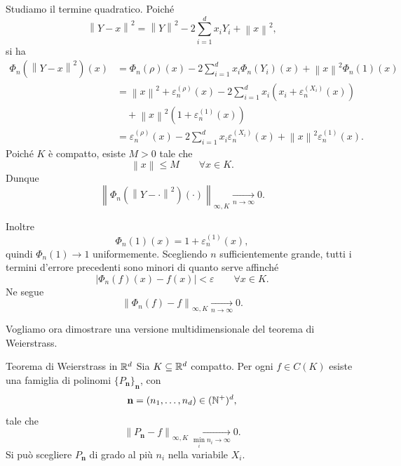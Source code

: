 \documentclass[a4paper]{article}
\begin{document}
\begin{snippetproof}{}
    Studiamo il termine quadratico. Poiché
    \[
        \left\|Y-x\right\|^2
        =
        \left\|Y\right\|^2
        -
        2\sum_{i=1}^{d}x_iY_i
        +
        \left\|x\right\|^2,
    \]
    si ha
    \begin{align*}
        \Phi_n(\left\|Y-x\right\|^2)(x)
        &=
        \Phi_n(\rho)(x)
        -
        2\sum_{i=1}^{d}x_i\Phi_n(Y_i)(x)
        +
        \left\|x\right\|^2\Phi_n(1)(x) \\
        &=
        \left\|x\right\|^2+\varepsilon_n^{(\rho)}(x)
        -
        2\sum_{i=1}^{d}x_i
        \left(x_i+\varepsilon_n^{(X_i)}(x)\right) \\
        &\quad
        +
        \left\|x\right\|^2
        \left(1+\varepsilon_n^{(1)}(x)\right) \\
        &=
        \varepsilon_n^{(\rho)}(x)
        -
        2\sum_{i=1}^{d}x_i\varepsilon_n^{(X_i)}(x)
        +
        \left\|x\right\|^2\varepsilon_n^{(1)}(x).
    \end{align*}
    Poiché \(K\) è compatto, esiste \(M>0\) tale che
    \[
        \left\|x\right\|\leq M
        \qquad
        \forall x\in K.
    \]
    Dunque
    \[
        \left\|
        \Phi_n(\left\|Y-\cdot\right\|^2)(\cdot)
        \right\|_{\infty,K}
        \xrightarrow[n\to\infty]{}
        0.
    \]

    Inoltre
    \[
        \Phi_n(1)(x)
        =
        1+\varepsilon_n^{(1)}(x),
    \]
    quindi \(\Phi_n(1)\to 1\) uniformemente. Scegliendo \(n\) sufficientemente grande, tutti i termini d'errore precedenti sono minori di quanto serve affinché
    \[
        \left|\Phi_n(f)(x)-f(x)\right|<\varepsilon
        \qquad
        \forall x\in K.
    \]
    Ne segue
    \[
        \left\|\Phi_n(f)-f\right\|_{\infty,K}
        \xrightarrow[n\to\infty]{}
        0.
    \]
\end{snippetproof}

Vogliamo ora dimostrare una versione multidimensionale del teorema di Weierstrass.

\begin{snippettheorem}{Teorema di Weierstrass in \(\mathbb{R}^d\)}
    Sia \(K\subseteq\mathbb{R}^d\) compatto. Per ogni \(f\in C(K)\) esiste una famiglia di polinomi \(\{P_{\mathbf n}\}_{\mathbf n}\), con
    \[
        \mathbf n=(n_1,\dots,n_d)\in(\mathbb{N}^+)^d,
    \]
    tale che
    \[
        \left\|P_{\mathbf n}-f\right\|_{\infty,K}
        \xrightarrow[\min_i n_i\to\infty]{}
        0.
    \]
    Si può scegliere \(P_{\mathbf n}\) di grado al più \(n_i\) nella variabile \(X_i\).
\end{snippettheorem}
\end{document}

